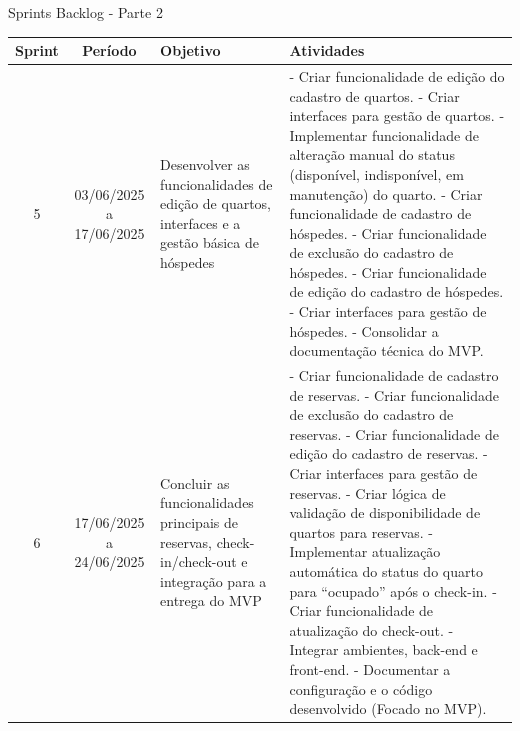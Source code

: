 \documentclass[
	12pt,				%
	openany,			%
	twoside,			%
	a4paper,			%
	english,			%
	french,				%
	spanish,			%
	brazil				%
	]{abntex2}
\begin{document}
\begin{quadro}[H]
	\caption{Sprints Backlog - Parte 2}
	 \label{sprints_backlog_2} 
	\begin{tabular}{|c|c|p{4cm}|p{6cm}|}
		\hline
		\textbf{Sprint} & \textbf{Período} & \textbf{Objetivo} & \textbf{Atividades} \\
		\hline	
		5 & 03/06/2025 a 17/06/2025 & Desenvolver as funcionalidades de edição de quartos, interfaces e a gestão básica de hóspedes &
		- Criar funcionalidade de edição do cadastro de quartos. \newline
		- Criar interfaces para gestão de quartos. \newline
		- Implementar funcionalidade de alteração manual do status (disponível, indisponível, em manutenção) do quarto. \newline
		- Criar funcionalidade de cadastro de hóspedes. \newline
		- Criar funcionalidade de exclusão do cadastro de hóspedes. \newline
		- Criar funcionalidade de edição do cadastro de hóspedes. \newline
		- Criar interfaces para gestão de hóspedes. \newline
		- Consolidar a documentação técnica do MVP. \\
		\hline	
		6 & 17/06/2025 a 24/06/2025 & Concluir as funcionalidades principais de reservas, check-in/check-out e integração para a entrega do MVP &
		- Criar funcionalidade de cadastro de reservas. \newline
		- Criar funcionalidade de exclusão do cadastro de reservas. \newline
		- Criar funcionalidade de edição do cadastro de reservas. \newline
		- Criar interfaces para gestão de reservas. \newline
		- Criar lógica de validação de disponibilidade de quartos para reservas. \newline
		- Implementar atualização automática do status do quarto para “ocupado” após o check-in. \newline
		- Criar funcionalidade de atualização do check-out. \newline
		- Integrar ambientes, back-end e front-end. \newline
		- Documentar a configuração e o código desenvolvido (Focado no MVP).
		\\
		\hline	
\end{tabular}
\end{quadro}
\end{document}
